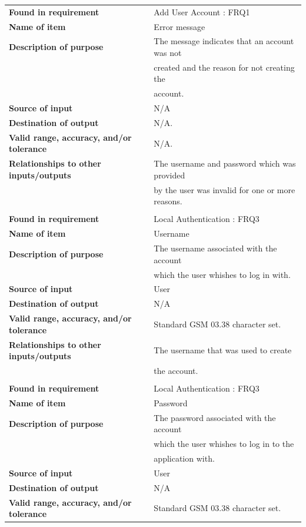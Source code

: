 \begin{tabular}{ll}
\textbf{Found in requirement}&Add User Account : FRQ1\\
\textbf{Name of item}&Error message\\
\textbf{Description of purpose}&The message indicates that an account was not\\& created and the reason for not creating the\\& account.\\
\textbf{Source of input}&N/A\\
\textbf{Destination of output}&N/A.\\
\textbf{Valid range, accuracy, and/or tolerance}&N/A.\\
\textbf{Relationships to other inputs/outputs}&The username and password which was provided \\&by the user was invalid for one or more reasons.\\
&\\
\textbf{Found in requirement}&Local Authentication : FRQ3\\
\textbf{Name of item}&Username\\
\textbf{Description of purpose}&The username associated with the account \\&which the user whishes to log in with.\\
\textbf{Source of input}&User\\
\textbf{Destination of output}&N/A\\
\textbf{Valid range, accuracy, and/or tolerance}&Standard GSM 03.38 character set.\\
\textbf{Relationships to other inputs/outputs}&The username that was used to create\\& the account.\\
&\\
\textbf{Found in requirement}&Local Authentication : FRQ3\\
\textbf{Name of item}&Password\\
\textbf{Description of purpose}&The password associated with the account\\& which the user whishes to log in to the \\&application with.\\
\textbf{Source of input}&User\\
\textbf{Destination of output}&N/A\\
\textbf{Valid range, accuracy, and/or tolerance}&Standard GSM 03.38 character set.\\

\end{tabular}
